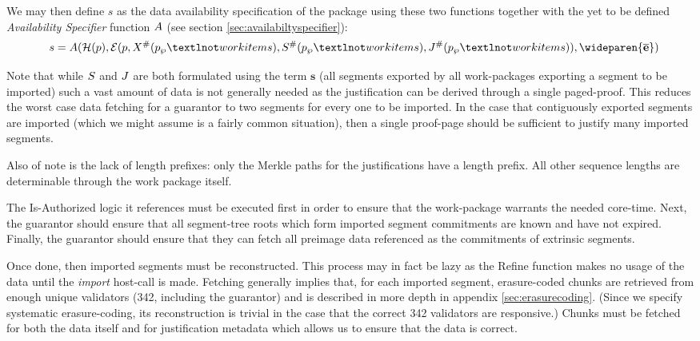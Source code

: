 We may then define $s$ as the data availability specification of the package using these two functions together with the yet to be defined \emph{Availability Specifier} function $A$ (see section \ref{sec:availabiltyspecifier}):
\begin{equation}
  s = \newavailabilityspecifier(
    \mathcal{H}(\wpX),
    \se(
      \wpX,
      \extrinsicdata^\#(\wpX_\wp¬workitems),
      \importsegmentdata^\#(\wpX_\wp¬workitems),
      \justifysegmentdata^\#(\wpX_\wp¬workitems)
    ),
    \wideparen{\overline{\mathbf{e}}}
  )\!\!\!\!
\end{equation}

Note that while $S$ and $J$ are both formulated using the term $\mathbf{s}$ (all segments exported by all work-packages exporting a segment to be imported) such a vast amount of data is not generally needed as the justification can be derived through a single paged-proof. This reduces the worst case data fetching for a guarantor to two segments for every one to be imported. In the case that contiguously exported segments are imported (which we might assume is a fairly common situation), then a single proof-page should be sufficient to justify many imported segments.

Also of note is the lack of length prefixes: only the Merkle paths for the justifications have a length prefix. All other sequence lengths are determinable through the work package itself.

The Is-Authorized logic it references must be executed first in order to ensure that the work-package warrants the needed core-time. Next, the guarantor should ensure that all segment-tree roots which form imported segment commitments are known and have not expired. Finally, the guarantor should ensure that they can fetch all preimage data referenced as the commitments of extrinsic segments.

Once done, then imported segments must be reconstructed. This process may in fact be lazy as the Refine function makes no usage of the data until the \emph{import} host-call is made. Fetching generally implies that, for each imported segment, erasure-coded chunks are retrieved from enough unique validators (342, including the guarantor) and is described in more depth in appendix \ref{sec:erasurecoding}. (Since we specify systematic erasure-coding, its reconstruction is trivial in the case that the correct 342 validators are responsive.) Chunks must be fetched for both the data itself and for justification metadata which allows us to ensure that the data is correct.

